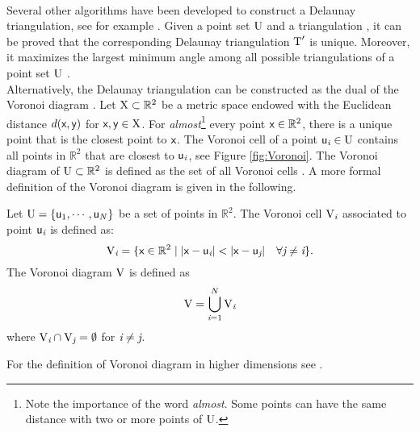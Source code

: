 \\ \indent Several other algorithms have been developed to construct a Delaunay triangulation, see for example \cite{lee1980two, renka1997algorithm}.
 Given a point set $\mbox{$\textup{U}$}$ and a triangulation , it can be proved that the corresponding Delaunay triangulation $\mbox{$\textup{T}$}^\prime$ is unique. Moreover, it maximizes the largest minimum angle among all possible triangulations of a point set $\mbox{$\textup{U}$}$ \cite{press2007numerical}.
\\ \indent Alternatively, the Delaunay triangulation can be constructed as the dual of the Voronoi diagram \cite{fortune1992voronoi}. Let $\mbox{$\textup{X}$}\subset\mathbb{R}^2$ be a metric space endowed with the Euclidean distance $d(\textsf{x}, \textsf{y})$ for $\textsf{x}, \textsf{y}\in \mbox{$\textup{X}$}$. For \textit{almost}\footnote{Note the importance of the word \textit{almost}. Some points can have the same distance with two or more points of $\mbox{$\textup{U}$}$.} every point $\textsf{x}\in \mathbb{R}^2$, there is a unique point that is the closest point to $\textsf{x}$. The Voronoi cell of a point $\textsf{u}_{\textit{i}}\in \mbox{$\textup{U}$}$ contains all points in $\mathbb{R}^2$ that are closest to $\textsf{u}_{\textit{i}}$, see Figure \ref{fig:Voronoi}. The Voronoi diagram of $\mbox{$\textup{U}$}\subset \mathbb{R}^2$ is defined as the set of all Voronoi cells \cite{cazals2005conformal}. A more formal definition of the Voronoi diagram is given in the following.
\begin{defn}
Let $\mbox{$\textup{U}$}=\{\textsf{u}_1,\cdots,\textsf{u}_N\}$ be a set of points in $\mathbb{R}^2$. The Voronoi cell $\mbox{$\textup{V}$}_{\textit{i}}$ associated to point $\textsf{u}_{\textit{i}}$ is defined as:
\begin{equation}
\mbox{\insieme{V}}_\variabile{i}=\{\point{x}\in \mathbb{R}^2\; | \;|\point{x}-\point{u}_\variabile{i}|<|\point{x}-\point{u}_\variabile{j}| \quad \forall \variabile{j}\neq \variabile{i} \}.
\end{equation}
The Voronoi diagram $\mbox{$\textup{V}$}$ is defined as 
\begin{equation}
\mbox{$\textup{V}$} = \bigcup_{\textit{i}=1}^N \mbox{$\textup{V}$}_{\textit{i}}
\end{equation}
 where $\mbox{$\textup{V}$}_{\textit{i}}\cap \mbox{$\textup{V}$}_{\textit{j}}= \emptyset$ for $\textit{i}\neq\textit{j}$.
\end{defn}
For the definition of Voronoi diagram in higher dimensions see \cite{brown1979voronoi}.
